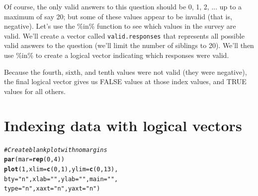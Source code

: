 \documentclass{tufte-book}\usepackage[]{graphicx}\usepackage[]{color}
\makeatletter
\newcommand{\hlnum}[1]{\textcolor[rgb]{0.686,0.059,0.569}{#1}}%
\newcommand{\hlstr}[1]{\textcolor[rgb]{0.192,0.494,0.8}{#1}}%
\newcommand{\hlcom}[1]{\textcolor[rgb]{0.678,0.584,0.686}{\textit{#1}}}%
\newcommand{\hlopt}[1]{\textcolor[rgb]{0,0,0}{#1}}%
\newcommand{\hlstd}[1]{\textcolor[rgb]{0.345,0.345,0.345}{#1}}%
\newcommand{\hlkwb}[1]{\textcolor[rgb]{0.69,0.353,0.396}{#1}}%
\newcommand{\hlkwc}[1]{\textcolor[rgb]{0.333,0.667,0.333}{#1}}%
\newcommand{\hlkwd}[1]{\textcolor[rgb]{0.737,0.353,0.396}{\textbf{#1}}}%
\newenvironment{kframe}{%
 \def\at@end@of@kframe{}%
 \ifinner\ifhmode%
  \def\at@end@of@kframe{\end{minipage}}%
  \begin{minipage}{\columnwidth}%
 \fi\fi%
 \def\FrameCommand##1{\hskip\@totalleftmargin \hskip-\fboxsep
 \colorbox{shadecolor}{##1}\hskip-\fboxsep
     \hskip-\linewidth \hskip-\@totalleftmargin \hskip\columnwidth}%
 \MakeFramed {\advance\hsize-\width
   \@totalleftmargin\z@ \linewidth\hsize
   \@setminipage}}%
 {\par\unskip\endMakeFramed%
 \at@end@of@kframe}
\newenvironment{knitrout}{}{} %
\makeatother
\begin{document}
\begin{footnotesize}
Of course, the only valid answers to this question should be 0, 1, 2, ... up to a maximum of say 20; but some of these values appear to be invalid (that is, negative). Let's use the \%in\% function to see which values in the survey are valid. We'll create a vector called \texttt{valid.responses} that represents all possible valid answers to the question (we'll limit the number of siblings to 20). We'll then use \%in\% to create a logical vector indicating which responses were valid. 


Because the fourth, sixth, and tenth values were not valid (they were negative), the final logical vector gives us FALSE values at those index values, and TRUE values for all others.

\section{Indexing data with logical vectors}

\begin{marginfigure}
\begin{tiny}
\begin{knitrout}
\color{fgcolor}\begin{kframe}
\begin{alltt}
\hlcom{# Create blank plot with no margins}
\hlkwd{par}\hlstd{(}\hlkwc{mar} \hlstd{=} \hlkwd{rep}\hlstd{(}\hlnum{0}\hlstd{,} \hlnum{4}\hlstd{))}
\hlkwd{plot}\hlstd{(}\hlnum{1}\hlstd{,} \hlkwc{xlim} \hlstd{=} \hlkwd{c}\hlstd{(}\hlnum{0}\hlstd{,} \hlnum{1}\hlstd{),} \hlkwc{ylim} \hlstd{=} \hlkwd{c}\hlstd{(}\hlnum{0}\hlstd{,} \hlnum{13}\hlstd{),}
     \hlkwc{bty} \hlstd{=} \hlstr{"n"}\hlstd{,} \hlkwc{xlab} \hlstd{=} \hlstr{""}\hlstd{,} \hlkwc{ylab} \hlstd{=} \hlstr{""}\hlstd{,} \hlkwc{main} \hlstd{=} \hlstr{""}\hlstd{,}
     \hlkwc{type} \hlstd{=} \hlstr{"n"}\hlstd{,} \hlkwc{xaxt} \hlstd{=} \hlstr{"n"}\hlstd{,} \hlkwc{yaxt} \hlstd{=} \hlstr{"n"}\hlstd{)}


\end{alltt}
\end{kframe}
\end{knitrout}
\end{tiny}
\end{marginfigure}
\end{footnotesize}
\end{document}
